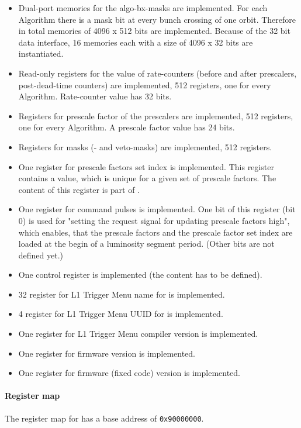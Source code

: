 \begin {itemize}
\item Dual-port memories for the algo-bx-masks are implemented. For each Algorithm there is a mask bit at every bunch crossing of one orbit. Therefore in total memories of 4096 x 512 bits
are implemented. Because of the 32 bit data interface, 16 memories each with a size of 4096 x 32 bits are instantiated.
\item Read-only registers for the value of rate-counters (before and after prescalers, post-dead-time counters) are implemented, 512 registers, one for every Algorithm. Rate-counter value has 32 bits.
\item Registers for prescale factor of the prescalers are implemented, 512 registers, one for every Algorithm. A prescale factor value has 24 bits.
\item Registers for masks (\finor- and veto-masks) are implemented, 512 registers.
\item One register for prescale factors set index is implemented. This register contains a value, which is unique for a given set of prescale factors. The content of this register is
part of \record.
\item One register for command pulses is implemented. One bit of this register (bit 0) is used for "setting the request signal for updating prescale factors high", which enables, that the prescale factors and the prescale factor set index
are loaded at the begin of a luminosity segment period. (Other bits are not defined yet.)
\item One control register is implemented (the content has to be defined).
\item 32 register for L1 Trigger Menu name for \ugtl is implemented.
\item 4 register for L1 Trigger Menu UUID for \ugtl is implemented.
\item One register for L1 Trigger Menu compiler version is implemented.
\item One register for \ufdl firmware version is implemented.
\item One register for \ugtl firmware (fixed code) version is implemented.
\end {itemize}

\paragraph{Register map}
\label{sec:fdl:reg_map}
The register map for \ufdl has a base address of \verb|0x90000000|.

